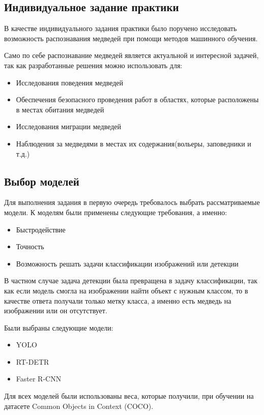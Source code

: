 \documentclass[../document.tex]{subfiles}
\begin{document}
    \subsection{Индивидуальное задание практики}
    \par В качестве индивидуального задания практики было поручено исследовать возможность распознавания медведей при помощи методов машинного обучения.
    \par Само по себе распознавание медведей является актуальной и интересной задачей, так как разработанные решения можно использовать для:
    \begin{itemize}
    	\item Исследования поведения медведей
    	\item Обеспечения безопасного проведения работ в областях, которые расположены в местах обитания медведей
    	\item Исследования миграции медведей
    	\item Наблюдения за медведями в местах их содержания(вольеры, заповедники и т.д.)
    \end{itemize}
    
    \subsection{Выбор моделей}
	    \par Для выполнения задания в первую очередь требовалось выбрать рассматриваемые модели. К моделям были применены следующие требования, а именно:
	    \begin{itemize}
	    	\item Быстродействие
	    	\item Точность
	    	\item Возможность решать задачи классификации изображений или детекции
	    \end{itemize}
	    \par В частном случае задача детекции была превращена в задачу классификации, так как если модель смогла на изображении найти объект с нужным классом, то в качестве ответа получали только метку класса, а именно есть медведь на изображении или он отсутствует.
	    \par Были выбраны следующие модели:
	    \begin{itemize}
	    	\item YOLO
	    	\item RT-DETR
	    	\item Faster R-CNN
	    \end{itemize}
	    \par Для всех моделей были использованы веса, которые получили, при обучении на датасете Common Objects in Context (COCO).
    
\end{document}
